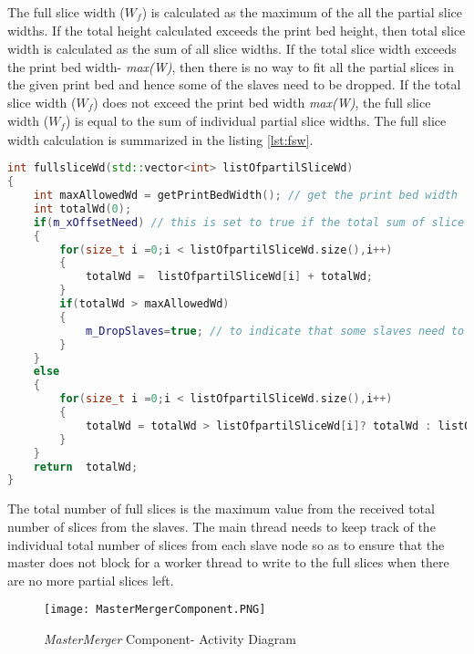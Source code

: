 The full slice width (\begin{math}W_{\textit{f}}\end{math}) is calculated as the maximum of the all the partial slice widths. If the total height calculated exceeds the print bed height, then total slice width is calculated as the sum of all slice widths. If the total slice width exceeds the print bed width- \textit{max(W)}, then there is no way to fit all the partial slices in the given print bed and hence some of the slaves need to be dropped. If the total slice width (\begin{math}W_{\textit{f}}\end{math}) does not exceed the print bed width \textit{max(W)}, the full slice width (\begin{math}W_{\textit{f}}\end{math}) is equal to the sum of individual partial slice widths. The full slice width calculation is summarized in the listing \ref{lst:fsw}.\newline     


\begin{lstlisting}[language=C++,label={lst:fsw},caption={Calculate full slice width}]
int fullsliceWd(std::vector<int> listOfpartilSliceWd)
{
	int maxAllowedWd = getPrintBedWidth(); // get the print bed width
	int totalWd(0);
	if(m_xOffsetNeed) // this is set to true if the total sum of slice heights > print bed height.
	{
		for(size_t i =0;i < listOfpartilSliceWd.size(),i++)
		{
			totalWd =  listOfpartilSliceWd[i] + totalWd;
		}
		if(totalWd > maxAllowedWd)
		{
			m_DropSlaves=true; // to indicate that some slaves need to be dropped
		}
	}
	else
	{
		for(size_t i =0;i < listOfpartilSliceWd.size(),i++)
		{
			totalWd = totalWd > listOfpartilSliceWd[i]? totalWd : listOfpartilSliceWd[i];
		}
	}
	return 	totalWd;
}
\end{lstlisting}

The total number of full slices is the maximum value from the received total number of slices from the slaves. The main thread needs to keep track of the individual total number of slices from each slave node so as to ensure that the master does not block for a worker thread to write to the full slices when there are no more partial slices left. 

\begin{figure}[ht!]
\centering
\texttt{[image: MasterMergerComponent.PNG]}
\caption{\textit{MasterMerger} Component- Activity Diagram}
\label{fig:MasterMergerComponent}
\end{figure}

